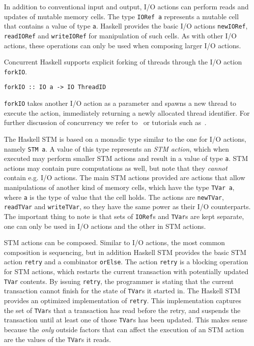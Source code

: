 In addition to conventional input and output, I/O actions can perform reads and updates of mutable memory
cells. The type \lstinline+IORef a+ represents a mutable cell that contains a value of type \lstinline+a+. 
Haskell provides the basic I/O actions \lstinline+newIORef+, \lstinline+readIORef+ and \lstinline+writeIORef+
for manipulation of such cells. As with other I/O actions, these operations can only be used when composing
larger I/O actions.

Concurrent Haskell supports explicit forking of threads through the I/O action \lstinline+forkIO+.
\begin{lstlisting}[style=small]
forkIO :: IO a -> IO ThreadID
\end{lstlisting}
\lstinline+forkIO+ takes another I/O action as a parameter and spawns a new thread to execute the action, 
immediately
returning a newly allocated thread identifier. For further discussion of concurrency we refer to~\cite{awkward}
or tutorials such as~\cite{partutorial}.

The Haskell STM is based on a monadic type similar to the one for I/O actions, namely \lstinline+STM a+.
A value of this type represents an {\em STM action}, which when executed may perform smaller STM actions and
result in a value of type \mbox{\lstinline+a+.} %
STM actions may contain pure computations as well, but note that
they {\em cannot} contain e.g. I/O actions. The main STM actions provided are actions that allow manipulations
of another kind of memory cells, which have the type \mbox{\lstinline+TVar a+}, %
where \lstinline+a+ is the type of
value that the cell holds. The actions are \lstinline+newTVar+, \lstinline+readTVar+ and \lstinline+writeTVar+,
so they have the same power as their I/O counterparts. The important thing to note is that sets of \lstinline+IORef+s
and \lstinline+TVar+s are kept separate, one can only be used in I/O actions and the other in STM actions.

STM actions can be composed. Similar to I/O actions, the most common composition is sequencing,
but in addition Haskell STM provides the basic STM action \lstinline+retry+ and a combinator
\lstinline+orElse+. The action \lstinline+retry+ is a blocking operation for 
STM actions, which restarts the current transaction with potentially updated \lstinline+TVar+ contents. 
By issuing \lstinline+retry+, the programmer is stating
that the current transaction cannot finish for the state of \lstinline+TVar+s it started in. 
The Haskell STM provides an optimized implementation of \lstinline+retry+. This implementation captures
the set of \lstinline+TVar+s that a transaction has read before the retry, and suspends the transaction
until at least one of those \lstinline+TVar+s has been updated.
This makes sense because the {\em only} outside factors that can
affect the execution of an STM action are the values of the \lstinline+TVar+s it reads.

